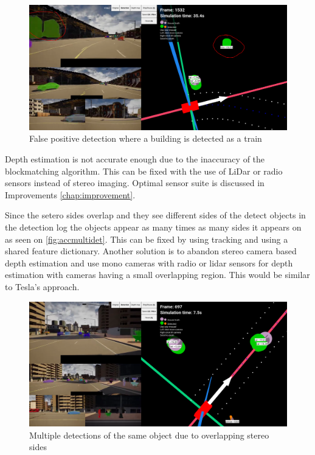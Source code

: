 \begin{figure}[!ht]
	\centering
	\includegraphics[width=150mm, keepaspectratio]{figures/accfalsepositive.png}
	\caption{False positive detection where a building is detected as a train}
	\label{fig:accfalsepositive}
\end{figure}


Depth estimation is not accurate enough due to the inaccuracy of the
blockmatching algorithm. This can be fixed with the use of LiDar or radio
sensors instead of stereo imaging. Optimal sensor suite is discussed in
Improvements \autoref{chap:improvement}.

Since the setero sides overlap and they see different sides of the detect
objects in the detection log the objects appear as many times as many sides it
appears on as seen on \autoref{fig:accmultidet}. This can be fixed by using tracking and using a shared feature
dictionary. Another solution is to abandon stereo camera based depth estimation
and use mono cameras with radio or lidar sensors for depth estimation with
cameras having a small overlapping region. This would be similar to Tesla's
approach.

\begin{figure}[!ht]
	\centering
	\includegraphics[width=150mm, keepaspectratio]{figures/accmultidet.png}
	\caption{Multiple detections of the same object due to overlapping stereo sides}
	\label{fig:accmultidet}
\end{figure}

